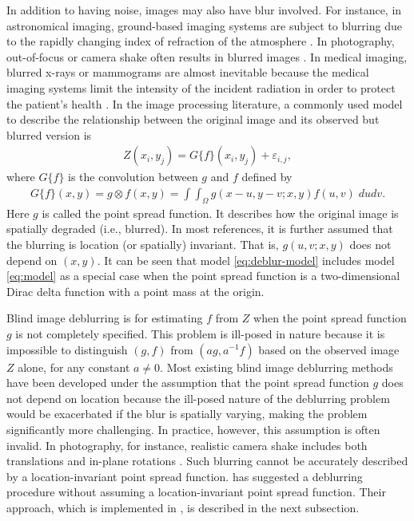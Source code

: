 In addition to having noise, images may also have blur involved. For instance, in astronomical imaging, ground-based imaging systems are subject to blurring due to the rapidly changing index of refraction of the atmosphere \citep{krist1995simulation, schulz1993multiframe}. In photography, out-of-focus or camera shake often results in blurred images \citep{fergus2006removing}. In medical imaging, blurred x-rays or mammograms are almost inevitable because the medical imaging systems limit the intensity of the incident radiation in order to protect the patient's health \citep{faulkner1989veiling}. In the image processing literature, a commonly used model to describe the relationship between the original image and its observed but blurred version is
\begin{align}
  \label{eq:deblur-model}
  Z(x_i, y_j) = G\{f\}(x_i, y_j) + \varepsilon_{i, j}, 
\end{align}
where \(G\{f\}\) is the convolution between \(g\) and \(f\) defined by
\begin{align*}
  G\{f\}(x,y) = g\otimes f(x, y) = \int\int_\Omega g(x-u,y-v; x, y) f(u,v)\; dudv.
\end{align*}
Here \(g\) is called the point spread function. It describes how the original image is spatially degraded (i.e., blurred). In most references, it is further assumed that the blurring is location (or spatially) invariant. That is, \(g(u, v;x, y)\) does not depend on \((x, y)\). It can be seen that model \eqref{eq:deblur-model} includes model \eqref{eq:model} as a special case when the point spread function is a two-dimensional Dirac delta function with a point mass at the origin.

Blind image deblurring is for estimating \(f\) from \(Z\) when the point spread function \(g\) is not completely specified. This problem is ill-posed in nature because it is impossible to distinguish \((g,f)\) from \((ag, a^{-1}f)\) based on the observed image \(Z\) alone, for any constant \(a\neq 0\). Most existing blind image deblurring methods have been developed under the assumption that the point spread function \(g\) does not depend on location because the ill-posed nature of the deblurring problem would be exacerbated if the blur is spatially varying, making the problem significantly more challenging. In practice, however, this assumption is often invalid. In photography, for instance, realistic camera shake includes both translations and in-plane rotations \citep{levin2011understanding}. Such blurring cannot be accurately described by a location-invariant point spread function. \citet{kang2020consistent} has suggested a deblurring procedure without assuming a location-invariant point spread function. Their approach, which is implemented in , is described in the next subsection.

